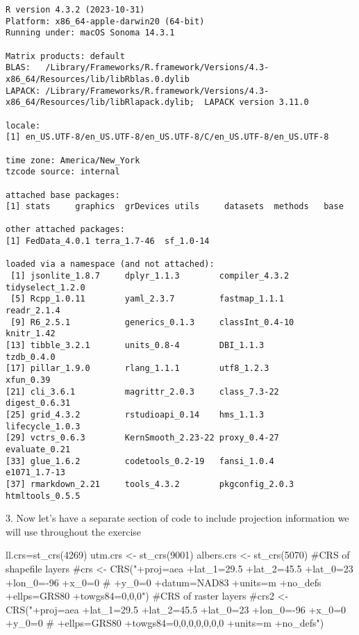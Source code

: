 \documentclass[
  letterpaper,
]{book}
\newenvironment{Shaded}{\begin{snugshade}}{\end{snugshade}}
\newcommand{\CommentTok}[1]{\textcolor[rgb]{0.37,0.37,0.37}{#1}}
\newcommand{\DecValTok}[1]{\textcolor[rgb]{0.68,0.00,0.00}{#1}}
\newcommand{\FunctionTok}[1]{\textcolor[rgb]{0.28,0.35,0.67}{#1}}
\newcommand{\NormalTok}[1]{\textcolor[rgb]{0.00,0.23,0.31}{#1}}
\newcommand{\OtherTok}[1]{\textcolor[rgb]{0.00,0.23,0.31}{#1}}
\begin{document}
\begin{verbatim}
R version 4.3.2 (2023-10-31)
Platform: x86_64-apple-darwin20 (64-bit)
Running under: macOS Sonoma 14.3.1

Matrix products: default
BLAS:   /Library/Frameworks/R.framework/Versions/4.3-x86_64/Resources/lib/libRblas.0.dylib 
LAPACK: /Library/Frameworks/R.framework/Versions/4.3-x86_64/Resources/lib/libRlapack.dylib;  LAPACK version 3.11.0

locale:
[1] en_US.UTF-8/en_US.UTF-8/en_US.UTF-8/C/en_US.UTF-8/en_US.UTF-8

time zone: America/New_York
tzcode source: internal

attached base packages:
[1] stats     graphics  grDevices utils     datasets  methods   base     

other attached packages:
[1] FedData_4.0.1 terra_1.7-46  sf_1.0-14    

loaded via a namespace (and not attached):
 [1] jsonlite_1.8.7     dplyr_1.1.3        compiler_4.3.2     tidyselect_1.2.0  
 [5] Rcpp_1.0.11        yaml_2.3.7         fastmap_1.1.1      readr_2.1.4       
 [9] R6_2.5.1           generics_0.1.3     classInt_0.4-10    knitr_1.42        
[13] tibble_3.2.1       units_0.8-4        DBI_1.1.3          tzdb_0.4.0        
[17] pillar_1.9.0       rlang_1.1.1        utf8_1.2.3         xfun_0.39         
[21] cli_3.6.1          magrittr_2.0.3     class_7.3-22       digest_0.6.31     
[25] grid_4.3.2         rstudioapi_0.14    hms_1.1.3          lifecycle_1.0.3   
[29] vctrs_0.6.3        KernSmooth_2.23-22 proxy_0.4-27       evaluate_0.21     
[33] glue_1.6.2         codetools_0.2-19   fansi_1.0.4        e1071_1.7-13      
[37] rmarkdown_2.21     tools_4.3.2        pkgconfig_2.0.3    htmltools_0.5.5   
\end{verbatim}

3. Now let's have a separate section of code to include projection
information we will use throughout the exercise

\begin{Shaded}
\begin{Highlighting}[]
\NormalTok{ll.crs}\OtherTok{=}\FunctionTok{st\_crs}\NormalTok{(}\DecValTok{4269}\NormalTok{)}
\NormalTok{utm.crs }\OtherTok{\textless{}{-}} \FunctionTok{st\_crs}\NormalTok{(}\DecValTok{9001}\NormalTok{) }
\NormalTok{albers.crs }\OtherTok{\textless{}{-}} \FunctionTok{st\_crs}\NormalTok{(}\DecValTok{5070}\NormalTok{) }\CommentTok{\#CRS of shapefile layers \#crs \textless{}{-} CRS("+proj=aea +lat\_1=29.5 +lat\_2=45.5 +lat\_0=23 +lon\_0={-}96 +x\_0=0  \#  +y\_0=0 +datum=NAD83 +units=m +no\_defs +ellps=GRS80 +towgs84=0,0,0") \#CRS of raster layers \#crs2 \textless{}{-} CRS("+proj=aea +lat\_1=29.5 +lat\_2=45.5 +lat\_0=23 +lon\_0={-}96 +x\_0=0 +y\_0=0  \#  +ellps=GRS80 +towgs84=0,0,0,0,0,0,0 +units=m +no\_defs") }
\end{Highlighting}
\end{Shaded}
\end{document}
